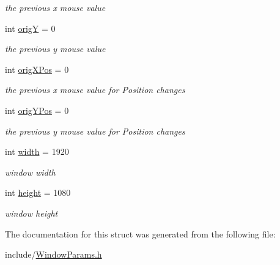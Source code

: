 \begin{DoxyCompactItemize}
\begin{DoxyCompactList}\small\item\em the previous x mouse value \end{DoxyCompactList}\item 
\hypertarget{struct_win_params_a9e4ef1b5ef96c1f6bbe46bb10c11d59b}{int \hyperlink{struct_win_params_a9e4ef1b5ef96c1f6bbe46bb10c11d59b}{orig\-Y} = 0}\label{struct_win_params_a9e4ef1b5ef96c1f6bbe46bb10c11d59b}

\begin{DoxyCompactList}\small\item\em the previous y mouse value \end{DoxyCompactList}\item 
\hypertarget{struct_win_params_ab07a11274084415333c1fd0a5fc03667}{int \hyperlink{struct_win_params_ab07a11274084415333c1fd0a5fc03667}{orig\-X\-Pos} = 0}\label{struct_win_params_ab07a11274084415333c1fd0a5fc03667}

\begin{DoxyCompactList}\small\item\em the previous x mouse value for Position changes \end{DoxyCompactList}\item 
\hypertarget{struct_win_params_a5dc76afc1f5486221ee40eee3cb9a5ac}{int \hyperlink{struct_win_params_a5dc76afc1f5486221ee40eee3cb9a5ac}{orig\-Y\-Pos} = 0}\label{struct_win_params_a5dc76afc1f5486221ee40eee3cb9a5ac}

\begin{DoxyCompactList}\small\item\em the previous y mouse value for Position changes \end{DoxyCompactList}\item 
\hypertarget{struct_win_params_abe7daa1f3fc56dc639141bcbee759c02}{int \hyperlink{struct_win_params_abe7daa1f3fc56dc639141bcbee759c02}{width} = 1920}\label{struct_win_params_abe7daa1f3fc56dc639141bcbee759c02}

\begin{DoxyCompactList}\small\item\em window width \end{DoxyCompactList}\item 
\hypertarget{struct_win_params_a9b7c0ae0270bc1f7cfad6d95524b886b}{int \hyperlink{struct_win_params_a9b7c0ae0270bc1f7cfad6d95524b886b}{height} = 1080}\label{struct_win_params_a9b7c0ae0270bc1f7cfad6d95524b886b}

\begin{DoxyCompactList}\small\item\em window height \end{DoxyCompactList}\end{DoxyCompactItemize}


The documentation for this struct was generated from the following file\-:\begin{DoxyCompactItemize}
\item 
include/\hyperlink{_window_params_8h}{Window\-Params.\-h}\end{DoxyCompactItemize}
